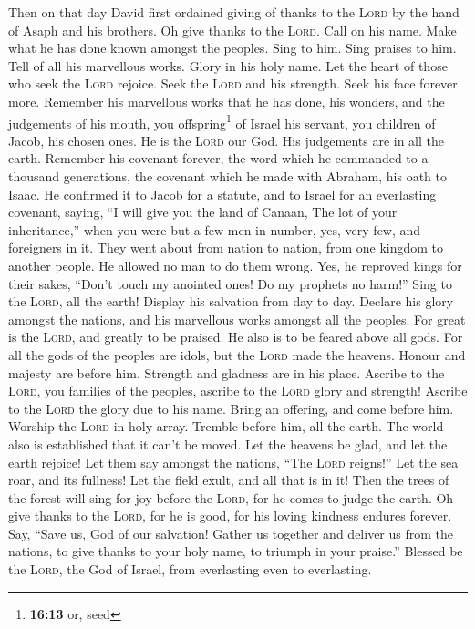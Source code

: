 Then on that day David first ordained giving of thanks to
the \textsc{Lord} by the hand of Asaph and his brothers. 
Oh give thanks to the \textsc{Lord}. Call on his name. Make what he has
done known amongst the peoples.  Sing to him. Sing praises
to him. Tell of all his marvellous works.  Glory in his
holy name. Let the heart of those who seek the \textsc{Lord} rejoice.
 Seek the \textsc{Lord} and his strength. Seek his face
forever more.  Remember his marvellous works that he has
done, his wonders, and the judgements of his mouth,  you
offspring\footnote{\textbf{16:13} or, seed} of Israel his servant, you
children of Jacob, his chosen ones.  He is the
\textsc{Lord} our God. His judgements are in all the earth.
 Remember his covenant forever, the word which he
commanded to a thousand generations,  the covenant which
he made with Abraham, his oath to Isaac.  He confirmed it
to Jacob for a statute, and to Israel for an everlasting covenant,
 saying, ``I will give you the land of Canaan, The lot of
your inheritance,''  when you were but a few men in
number, yes, very few, and foreigners in it.  They went
about from nation to nation, from one kingdom to another people.
 He allowed no man to do them wrong. Yes, he reproved
kings for their sakes,  ``Don't touch my anointed ones!
Do my prophets no harm!''  Sing to the \textsc{Lord}, all
the earth! Display his salvation from day to day. 
Declare his glory amongst the nations, and his marvellous works amongst
all the peoples.  For great is the \textsc{Lord}, and
greatly to be praised. He also is to be feared above all gods.
 For all the gods of the peoples are idols, but the
\textsc{Lord} made the heavens.  Honour and majesty are
before him. Strength and gladness are in his place. 
Ascribe to the \textsc{Lord}, you families of the peoples, ascribe to
the \textsc{Lord} glory and strength!  Ascribe to the
\textsc{Lord} the glory due to his name. Bring an offering, and come
before him. Worship the \textsc{Lord} in holy array. 
Tremble before him, all the earth. The world also is established that it
can't be moved.  Let the heavens be glad, and let the
earth rejoice! Let them say amongst the nations, ``The \textsc{Lord}
reigns!''  Let the sea roar, and its fullness! Let the
field exult, and all that is in it!  Then the trees of
the forest will sing for joy before the \textsc{Lord}, for he comes to
judge the earth.  Oh give thanks to the \textsc{Lord},
for he is good, for his loving kindness endures forever. 
Say, ``Save us, God of our salvation! Gather us together and deliver us
from the nations, to give thanks to your holy name, to triumph in your
praise.''  Blessed be the \textsc{Lord}, the God of
Israel, from everlasting even to everlasting.

